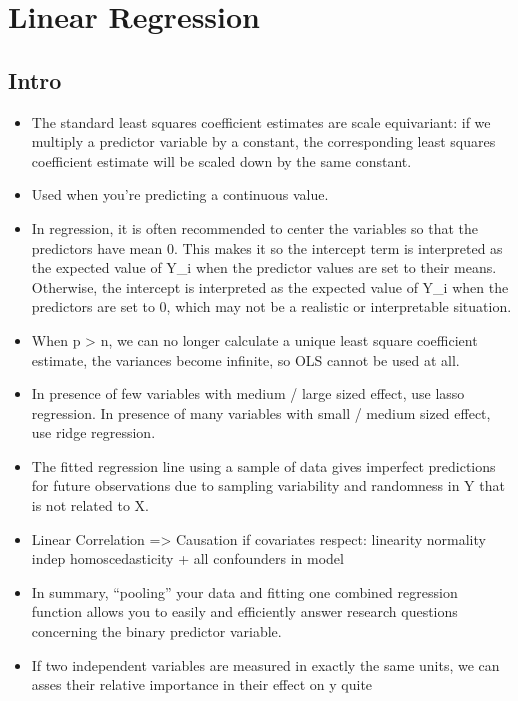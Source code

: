 \documentclass[]{book}
\theoremstyle{definition}
\theoremstyle{definition}
\theoremstyle{definition}
\theoremstyle{remark}
\begin{document}
\section{Linear Regression}\label{linear-regression}

\subsection{Intro}\label{intro}

\begin{itemize}
\item
  The standard least squares coefficient estimates are scale
  equivariant: if we multiply a predictor variable by a constant, the
  corresponding least squares coefficient estimate will be scaled down
  by the same constant.
\item
  Used when you're predicting a continuous value.
\item
  In regression, it is often recommended to center the variables so that
  the predictors have mean 0. This makes it so the intercept term is
  interpreted as the expected value of Y\_i when the predictor values
  are set to their means. Otherwise, the intercept is interpreted as the
  expected value of Y\_i when the predictors are set to 0, which may not
  be a realistic or interpretable situation.
\item
  When p \textgreater{} n, we can no longer calculate a unique least
  square coefficient estimate, the variances become infinite, so OLS
  cannot be used at all.
\item
  In presence of few variables with medium / large sized effect, use
  lasso regression. In presence of many variables with small / medium
  sized effect, use ridge regression.
\item
  The fitted regression line using a sample of data gives imperfect
  predictions for future observations due to sampling variability and
  randomness in Y that is not related to X.
\item
  Linear Correlation =\textgreater{} Causation if covariates respect:
  linearity normality indep homoscedasticity + all confounders in model
\item
  In summary, ``pooling'' your data and fitting one combined regression
  function allows you to easily and efficiently answer research
  questions concerning the binary predictor variable.
\item
  If two independent variables are measured in exactly the same units,
  we can asses their relative importance in their effect on y quite

\end{itemize}
\end{document}
